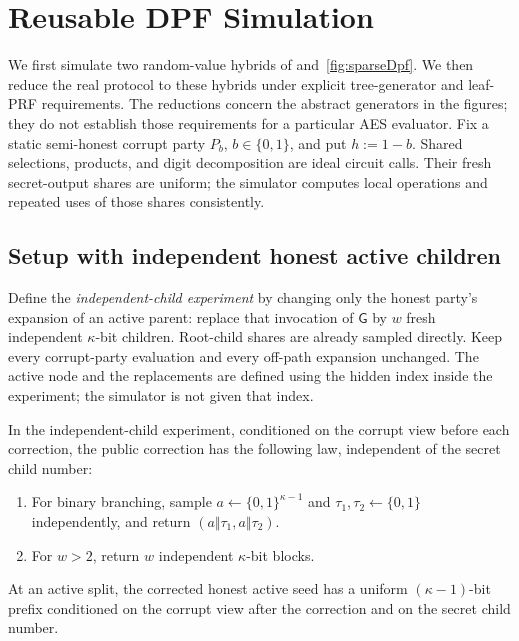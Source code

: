 \section{Reusable DPF Simulation}
\label{app:reusable-dpf-simulation}

We first simulate two random-value hybrids of
 and~\ref{fig:sparseDpf}. We then reduce the real
protocol to these hybrids under explicit tree-generator and leaf-PRF
requirements. The reductions concern the abstract generators in the figures;
they do not establish those requirements for a particular AES evaluator.
Fix a static semi-honest corrupt party $P_b$, $b\in\{0,1\}$, and put
$h:=1-b$. Shared selections, products, and digit decomposition are ideal
circuit calls. Their fresh secret-output shares are uniform; the simulator
computes local operations and repeated uses of those shares consistently.

\subsection{Setup with independent honest active children}

Define the \emph{independent-child experiment} by changing only the honest
party's expansion of an active parent: replace that invocation of
$\mathsf G$ by $w$ fresh independent $\kappa$-bit children. Root-child shares
are already sampled directly. Keep every corrupt-party evaluation and every
off-path expansion unchanged.
The active node and the replacements are defined using the hidden index
inside the experiment; the simulator is not given that index.

\begin{lemma}
\label{lem:dpf-correction-distribution}
In the independent-child experiment, conditioned on the corrupt view before
each correction, the public correction has the following law, independent
of the secret child number:
\begin{enumerate}
 \item For binary branching, sample $a\gets\{0,1\}^{\kappa-1}$ and
 $\tau_1,\tau_2\gets\{0,1\}$ independently, and return
 $(a\Vert\tau_1,a\Vert\tau_2)$.
 \item For $w>2$, return $w$ independent $\kappa$-bit blocks.
\end{enumerate}
At an active split, the corrected honest active seed has a uniform
$(\kappa-1)$-bit prefix conditioned on the corrupt view after the correction
and on the secret child number.
\end{lemma}

